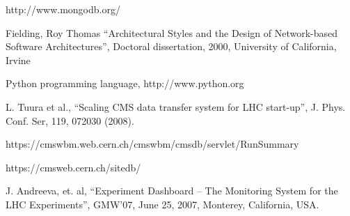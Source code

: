 \documentclass[1p,times]{elsarticle}
\begin{document}
\begin{thebibliography}{00}
http://www.mongodb.org/

Fielding, Roy Thomas ``Architectural Styles and the Design of 
Network-based Software Architectures'', Doctoral dissertation, 2000,
University of California, Irvine

 Python programming language, http://www.python.org

L. Tuura et al., 
``Scaling CMS data transfer system for LHC start-up'', 
J. Phys. Conf. Ser, 119, 072030 (2008).

https://cmswbm.web.cern.ch/cmswbm/cmsdb/servlet/RunSummary

https://cmsweb.cern.ch/sitedb/




J. Andreeva, et. al,
``Experiment Dashboard – The Monitoring System for the LHC Experiments'',
GMW’07, June 25, 2007, Monterey, California, USA.


\end{thebibliography}
\end{document}
